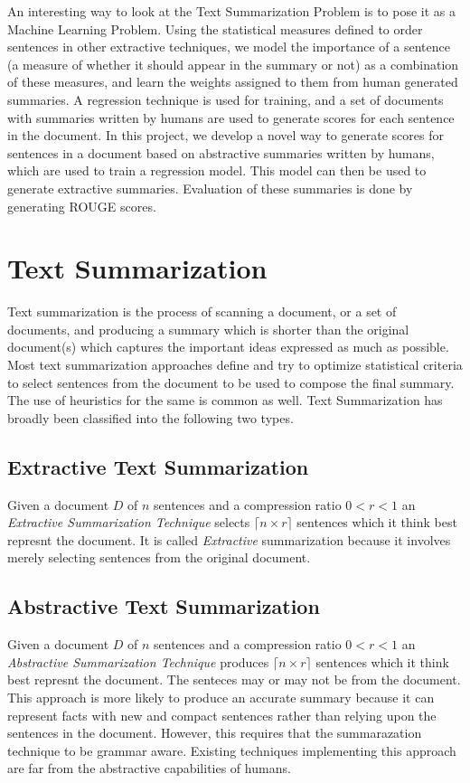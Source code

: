\documentclass[paper=a4, fontsize=11pt]{scrartcl} %
\numberwithin{equation}{section} %
\numberwithin{figure}{section} %
\numberwithin{table}{section} %
\begin{document}
An interesting way to look at the Text Summarization Problem is to pose it as a Machine Learning Problem. Using the statistical measures defined to order sentences in other extractive techniques, we model the importance of a sentence (a measure of whether it should appear in the summary or not) as a combination of these measures, and learn the weights assigned to them from human generated summaries. A regression technique is used for training, and a set of documents with summaries written by humans are used to generate scores for each sentence in the document.  In this project, we develop a novel way to generate scores for sentences in a document based on abstractive summaries written by humans, which are used to train a regression model. This model can then be used to generate extractive summaries. Evaluation of these summaries is done by generating ROUGE scores.
\section{Text Summarization}
Text summarization is the process of scanning a document, or a set of documents, and producing a summary which is shorter than the original document(s) which captures the important ideas expressed as much as possible. Most text summarization approaches define and try to optimize statistical criteria to select sentences from the document to be used to compose the final summary. The use of heuristics for the same is common as well.%
Text Summarization has broadly been classified into the following two types. %
\subsection{Extractive Text Summarization}
Given a document $D$ of $n$ sentences and a compression ratio $ 0 < r < 1 $ an \emph{Extractive Summarization Technique} selects $\lceil n \times r \rceil $  sentences which it think best represnt the document. It is called \emph{Extractive} summarization because it involves merely selecting sentences from the original document.
\subsection{Abstractive Text Summarization}
Given a document $D$ of $n$ sentences and a compression ratio $ 0 < r < 1 $ an \emph{Abstractive Summarization Technique} produces $\lceil n \times r \rceil $  sentences which it think best represnt the document. The senteces may or may not be from the document. This approach is more likely to produce an accurate summary because it can represent facts with new and compact sentences rather than relying upon the sentences in the document. However, this requires that the summarazation technique to be grammar aware. Existing techniques implementing this approach are far from the abstractive capabilities of humans.
\end{document}
